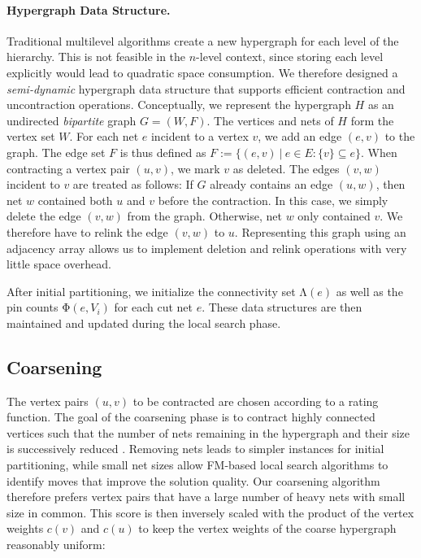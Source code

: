 \documentclass[runningheads,a4paper]{llncs}
\begin{document}
\paragraph{Hypergraph Data Structure.}
Traditional multilevel algorithms create a new hypergraph  for each level of the hierarchy. This is not feasible
in the $n$-level context, since storing each level explicitly would lead to quadratic space consumption. 
We therefore designed a \emph{semi-dynamic} hypergraph data structure that supports efficient contraction and uncontraction operations.
Conceptually, we represent the hypergraph $H$ as an undirected \emph{bipartite} graph $G=(W, F)$. The vertices and nets
of $H$ form the vertex set $W$. For each net $e$ incident to a vertex $v$, we add an edge $(e,v)$ to the graph.
The edge set $F$ is thus defined as $F := \{(e,v)~|~e \in E : \{v\} \subseteq e \}$.
When contracting a vertex pair $(u,v)$, we mark $v$ as deleted. The edges $(v,w)$ incident to $v$ are treated as follows:
If $G$ already contains an edge $(u,w)$, then net $w$ contained both $u$ and $v$ before the contraction. 
In this case, we simply delete the edge $(v,w)$ from the graph. Otherwise, net $w$ only contained $v$. We therefore have to
relink the edge $(v,w)$ to $u$.
Representing this graph using an adjacency array allows us to implement deletion and relink operations with very little space overhead.

After initial partitioning, we initialize the connectivity set $\mathrm{\Lambda}(e)$ as well as the pin counts $\mathrm{\Phi}(e,V_i)$ for each
cut net $e$. These data structures are then maintained and updated during the local search phase.

\subsection{Coarsening} \label{Coarsening}
The vertex pairs $(u,v)$ to be contracted are chosen according to a rating function. The goal of the coarsening phase
is to contract highly connected vertices such that the number of nets remaining in the hypergraph and their size is
successively reduced \cite{hMetisRB}. Removing nets leads to simpler instances for initial partitioning, while small net sizes allow
 FM-based local search algorithms to identify moves that improve the solution quality. Our coarsening algorithm therefore prefers vertex 
pairs that have a large number of heavy nets with small size in common. This score is then inversely scaled with
the product of the vertex weights $c(v)$ and $c(u)$ to keep the vertex weights of the coarse hypergraph reasonably uniform: 
\end{document}
